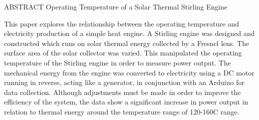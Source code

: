 \begin{center}
  \textsc{{\large ABSTRACT}}
  \singlespacing
  {Operating Temperature of a Solar Thermal Stirling Engine}
  \doublespacing
\end{center}
\vspace{12pt}

    This paper explores the relationship between the operating temperature and electricity production of a simple heat engine. A Stirling engine was designed and constructed which runs on solar thermal energy collected by a Fresnel lens. The surface area of the solar collector was varied. This manipulated the operating temperature of the Stirling engine in order to measure power output. The mechanical energy from the engine was converted to electricity using a DC motor running in reverse, acting like a generator, in conjunction with an Arduino for data collection. Although adjustments must be made in order to improve the efficiency of the system, the data show a significant increase in power output in relation to thermal energy around the temperature range of 120-160\degree C range.